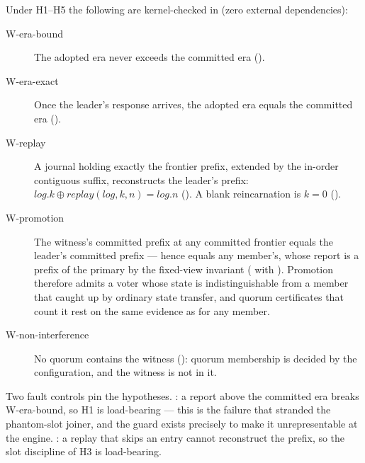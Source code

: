 Under H1--H5 the following are kernel-checked in 
(zero external dependencies):
\begin{description}
\item[W-era-bound] The adopted era never exceeds the committed era
  ().
\item[W-era-exact] Once the leader's response arrives, the adopted era
  equals the committed era ().
\item[W-replay] A journal holding exactly the frontier prefix, extended by
  the in-order contiguous suffix, reconstructs the leader's prefix:
  $\mathit{log}.k \oplus \mathit{replay}(\mathit{log},k,n) =
  \mathit{log}.n$ (). A blank reincarnation is
  $k=0$ ().
\item[W-promotion] The witness's committed prefix at any committed frontier
  equals the leader's committed prefix --- hence equals any member's, whose
  report is a prefix of the primary by the fixed-view invariant
  ( with
  ). Promotion therefore admits a voter
  whose state is indistinguishable from a member that caught up by
  ordinary state transfer, and quorum certificates that count it rest on
  the same evidence as for any member.
\item[W-non-interference] No quorum contains the witness
  (): quorum membership is decided by the
  configuration, and the witness is not in it.
\end{description}
Two fault controls pin the hypotheses. :
a report above the committed era breaks W-era-bound, so H1 is load-bearing
--- this is the failure that stranded the phantom-slot joiner, and the
guard exists precisely to make it unrepresentable at the engine.
: a replay that skips an entry cannot
reconstruct the prefix, so the slot discipline of H3 is load-bearing.

